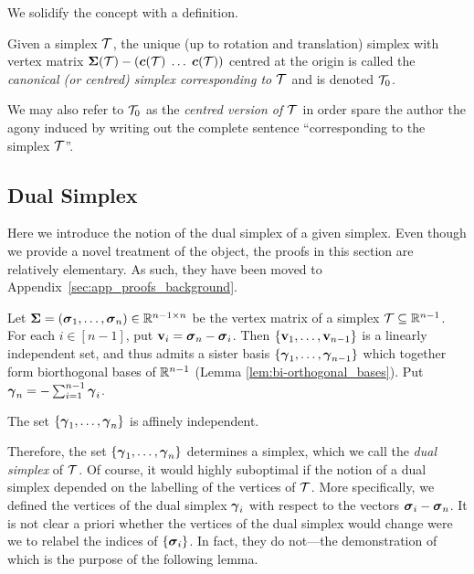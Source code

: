 We solidify the concept with a definition. 

\begin{definition}
	\label{def:centred_simplex}
	Given a simplex $\mathcal{T}$, the unique (up to rotation and translation) simplex with vertex matrix $\boldsymbol{\Sigma}(\mathcal{T}) - (\vb*{c}(\mathcal{T})\;\dots\;\vb*{c}(\mathcal{T}))$ centred at the origin is called the \emph{canonical (or centred) simplex corresponding to $\mathcal{T}$} and is denoted $\mathcal{T}_0$. 
\end{definition}

We may also refer to $\mathcal{T}_0$ as the \emph{centred version of $\mathcal{T}$} in order  spare  the author the agony induced by writing out the complete  sentence ``corresponding to the simplex $\mathcal{T}$''. 

 

\subsection{Dual Simplex}
\label{sec:background_dual_simplex}
Here we introduce the notion of the dual simplex of a given simplex. Even  though we provide a novel treatment  of  the object, the proofs in this section   are  relatively elementary. As such, they have been moved to Appendix~\ref{sec:app_proofs_background}. 

Let $\boldsymbol{\Sigma}=(\vb*{\sigma}_1,\dots,\vb*{\sigma}_n)\in\mathbb{R}^{n-1\times n}$ be the vertex matrix of a simplex $\mathcal{T}\subseteq\mathbb{R}^{n-1}$. For each $i\in[n-1]$, put $\vb{v}_i=\vb*{\sigma}_n-\vb*{\sigma}_i$. Then $\{\vb{v}_1,\dots,\vb{v}_{n-1}\}$ is a linearly independent set, and thus admits a sister basis $\{\vb*{\gamma}_1,\dots,\vb*{\gamma}_{n-1}\}$ which together form biorthogonal bases of $\mathbb{R}^{n-1}$ (Lemma \ref{lem:bi-orthogonal_bases}). Put $\vb*{\gamma}_n = -\sum_{i=1}^{n-1}\vb*{\gamma}_i$.  

\begin{claim}
	\label{claim:affine_independence}
The set 
$\{\vb*{\gamma}_1,\dots,\vb*{\gamma}_n\}$ is affinely independent. 
\end{claim}

Therefore, the set $\{\vb*{\gamma}_1,\dots,\vb*{\gamma}_n\}$ determines a simplex, which we call the \emph{dual simplex} of $\mathcal{T}$. Of course, it would highly suboptimal if the notion of a dual simplex depended on the labelling of the vertices of $\mathcal{T}$. More specifically, we defined the vertices of the dual simplex $\vb*{\gamma}_i$ with respect to the vectors $\vb*{\sigma}_i-\vb*{\sigma}_n$. It is not clear a priori whether the vertices of the dual simplex would change were we to relabel the indices of $\{\vb*{\sigma}_i\}$. In fact, they do not---the demonstration of which is the purpose of the following lemma. 

